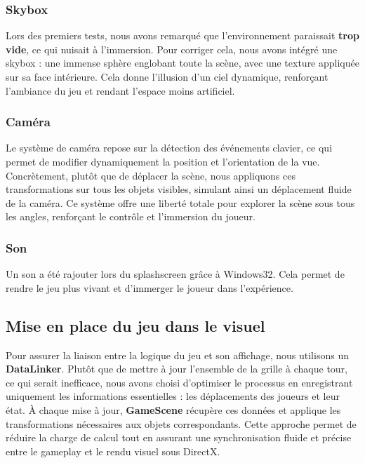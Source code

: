 \subsubsection{Skybox}
Lors des premiers tests, nous avons remarqué que l’environnement paraissait \textbf{trop vide}, ce qui nuisait à l’immersion. Pour corriger cela, nous avons intégré une skybox : une immense sphère englobant toute la scène, avec une texture appliquée sur sa face intérieure. Cela donne l’illusion d’un ciel dynamique, renforçant l’ambiance du jeu et rendant l’espace moins artificiel.
\subsubsection{Caméra}
Le système de caméra repose sur la détection des événements clavier, ce qui permet de modifier dynamiquement la position et l’orientation de la vue. Concrètement, plutôt que de déplacer la scène, nous appliquons ces transformations sur tous les objets visibles, simulant ainsi un déplacement fluide de la caméra. Ce système offre une liberté totale pour explorer la scène sous tous les angles, renforçant le contrôle et l’immersion du joueur.
\subsubsection{Son}
Un son a été rajouter lors du splashscreen grâce à Windows32. Cela permet de rendre le jeu plus vivant et d’immerger le joueur dans l’expérience.

\subsection{Mise en place du jeu dans le visuel}
Pour assurer la liaison entre la logique du jeu et son affichage, nous utilisons un \textbf{DataLinker}. Plutôt que de mettre à jour l’ensemble de la grille à chaque tour, ce qui serait inefficace, nous avons choisi d’optimiser le processus en enregistrant uniquement les informations essentielles : les déplacements des joueurs et leur état. À chaque mise à jour, \textbf{GameScene} récupère ces données et applique les transformations nécessaires aux objets correspondants. Cette approche permet de réduire la charge de calcul tout en assurant une synchronisation fluide et précise entre le gameplay et le rendu visuel sous DirectX.

